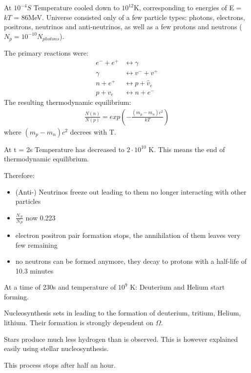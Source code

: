 \documentclass[11pt,a4paper]{article}
\begin{document}
At $10^{-4}S $ Temperature cooled down to $10^{12}$K, corresponding to energies of E = $kT$ = 86MeV.
Universe consisted only of a few particle types:
photons, electrons, positrons, neutrinos and anti-neutrinos, as well as a few protons and neutrons ($N_p = 10^{-10}N_{photons}$). 

The primary reactions were:
\begin{align*}
    e^- + e^+ &\leftrightarrow \gamma \\ 
    \gamma &\leftrightarrow v^- + v^+ \\ 
    n + e^+ &\leftrightarrow p + \hat v_e \\
    p + v_e &\leftrightarrow n + e^-
\end{align*}
The resulting thermodynamic equilibrium:
\begin{align*}
    \frac {N(n)}{N(p)} = exp (-\frac{(m_p - m_n)c^2}{kT}) 
\end{align*}
where $(m_p - m_n)c^2$ decrees with T.

At t = 2s Temperature has decreased to $2 \cdot 10^{10}$ K.
This means the end of thermodynamic equilibrium.

Therefore:
\begin{itemize}
    \item (Anti-) Neutrinos freeze out leading to them no longer interacting with other particles
    \item $\frac {N_N}{N_P}$ now 0.223
    \item electron positron pair formation stops, the annihilation of them leaves very few remaining 
    \item no neutrons can be formed anymore, they decay to protons with a half-life of 10.3 minutes 
\end{itemize}
At a time of 230s and temperature of $10^{9}$ K:
Deuterium and Helium start forming.

Nucleosynthesis sets in leading to the formation of deuterium, tritium, Helium, lithium.
Their formation is strongly dependent on $\Omega$. 

Stars produce much less hydrogen than is observed. 
This is however explained easily using stellar nucleosynthesis.

This process stops after half an hour.
\end{document}
